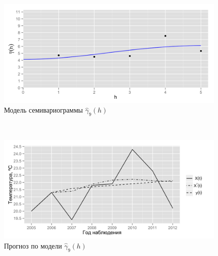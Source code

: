 \documentclass{beamer}
\begin{document}
\begin{frame}
\begin{multicols}{2}
    \columnbreak
    \begin{figure}[H]
      \begin{center}
        \begin{minipage}[H]{0.95\linewidth}
          \begin{center}
            \includegraphics[width=1\linewidth]{../../figures/variogram/auto-rob-5-modeled.png} \\ Модель семивариограммы $\widehat{\gamma}_9(h)$
          \end{center}
        \end{minipage}
        \\
        \begin{minipage}[H]{0.95\linewidth}
          \begin{center}
            \includegraphics[width=1\linewidth]{../../figures/variogram/auto-rob-5-cross-prediction.png} \\ Прогноз по модели $\widehat{\gamma}_9(h)$
          \end{center}
        \end{minipage}
      \end{center}
    \end{figure}
  \end{multicols}
\end{frame}
\end{document}
